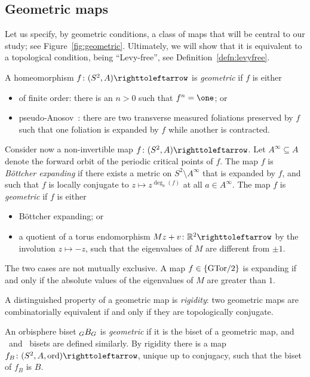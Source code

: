\documentclass{amsart}
\begin{document}
\subsection{Geometric maps}
Let us specify, by geometric conditions, a class of maps that will be
central to our study; see Figure~\ref{fig:geometric}. Ultimately, we will
show that it is equivalent to a topological condition, being ``Levy-free'',
see Definition~\ref{defn:levyfree}.

\begin{defn}
  A homeomorphism $f\colon (S^2,A)\selfmap$ is \emph{geometric} if $f$ is
  either
  \begin{itemize}
  \item[\FO] of finite order: there is an $n>0$ such that $f^n=\one$; or
  \item[\PA] pseudo-Anosov~\cite{thurston:surfaces}: there are two
    transverse measured foliations preserved by $f$ such that one
    foliation is expanded by $f$ while another is contracted.
  \end{itemize}

  Consider now a non-invertible map $f\colon (S^2,A)\selfmap$. Let
  $A^\infty\subseteq A$ denote the forward orbit of the periodic critical
  points of $f$. The map $f$ is \emph{B\"ottcher expanding} if there exists
  a metric on $S^2\setminus A^\infty$ that is expanded by $f$, and such
  that $f$ is locally conjugate to $z\mapsto z^{\deg_a(f)}$ at all $a\in
  A^\infty$. The map $f$ is \emph{geometric} if $f$ is either
  \begin{itemize}
  \item[\Exp] B\"ottcher expanding; or
  \item[\Tor] a quotient of a torus endomorphism
    $M z+v\colon\R^2\selfmap$ by the involution $z\mapsto-z$, such that
    the eigenvalues of $M$ are different from $\pm 1$.
  \end{itemize}
\end{defn}

The two cases are not mutually exclusive. A map $f\in\{\operatorname{GTor/2}\}$ is
expanding if and only if the absolute values of the eigenvalues of $M$
are greater than $1$.

A distinguished property of a geometric map is \emph{rigidity}: two
geometric maps are combinatorially equivalent if and only if they are topologically
conjugate.

An orbisphere biset $\subscript G B_{G}$ is \emph{geometric} if it is the biset
of a geometric map, and \Tor\ and \Exp\ bisets are defined
similarly. By rigidity there is a map $f_B\colon (S^2,A,\ord)\selfmap$, unique
up to conjugacy, such that the biset of $f_B$ is $B$.
\end{document}
